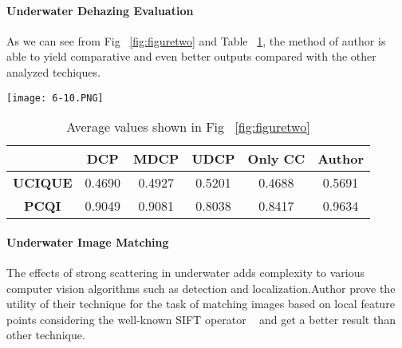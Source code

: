 \documentclass[10pt,twocolumn,letterpaper]{article}
\begin{document}
\paragraph{Underwater Dehazing Evaluation}
As we can see from Fig ~\ref{fig:figuretwo} and Table ~\ref{tab:table1}, the method of author is able to yield comparative and even better outputs compared with the other analyzed techiques.
\begin{figure*}[h]
\centering
\texttt{[image: 6-10.PNG]}
\caption{Estimated transmission maps generated by different specialized underwater techniques (DCP [17], MDCP [13], UDCP [20]) and our approach generated with four different reference images.}
\label{fig:figuretwo}
\end{figure*}
\begin{table}[h]
\caption{Average values shown in Fig ~\ref{fig:figuretwo}}
\label{tab:table1}
\begin{tabular}{|c|c|c|c|c|c|}
	\hline
	 & \textbf{DCP} & \textbf{MDCP} & \textbf{UDCP} & \textbf{Only CC} & \textbf{Author} \\ 	
	\hline
	\textbf{UCIQUE} & 0.4690 & 0.4927 & 0.5201 & 0.4688 & 0.5691 \\ 
	\hline 
	\textbf{PCQI} & 0.9049 & 0.9081 & 0.8038 & 0.8417 & 0.9634 \\ 
	\hline 
\end{tabular}
\end{table}



\paragraph{Underwater Image Matching}
The effects of strong scattering in underwater adds complexity to various computer vision algorithms such as detection and localization.Author prove the utility of their technique for the task of matching images based on local feature points considering the well-known SIFT operator ~\cite{Color2001_4} and get a better result than other technique.
\end{document}
